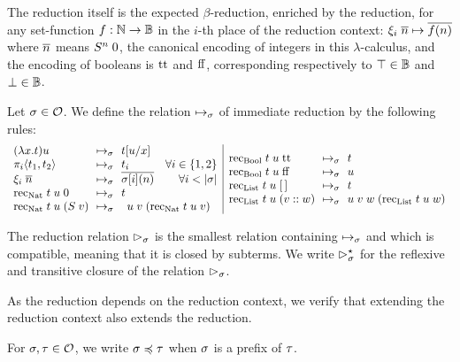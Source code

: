 \documentclass[a4paper,UKenglish,cleveref, autoref, thm-restate]{lipics-v2021}
\begin{document}
The reduction itself is the expected $\beta$-reduction, enriched by the reduction, for
any set-function $f : \mathbb N \to \mathbb B$ in the $i$-th place of the reduction context: $\xi_i \;\overline{n} \mapsto \overline{f(n)}$
where $\overline{n}$ means $S^n\;0$, the canonical encoding of integers in this $\lambda$-calculus, and the encoding of booleans is $\mathrm{tt}$ and $\mathrm{ff}$, corresponding respectively to $\top \in \mathbb B$ and $\bot \in \mathbb B$.

\begin{definition}[Reduction]
  Let $\sigma \in \mathcal O$.
  We define the relation $\mapsto_\sigma$ of immediate reduction by the following rules:
  \[\begin{array}{l@{~~}c@{~~}lr}
    (\lambda x.t)u & \rediE & t[u/x] \\
    \pi_i \langle t_1,t_2\rangle & \rediE & t_i & \forall i \in \{1,2\} \\
    \oracle_i\;\encode{n} & \rediE & \encode{\enviro[i](n)} & \forall i < |\enviro|\\
    \rec_{\Nat}\;t\;u\;\lamZ & \rediE & t \\
    \rec_{\Nat}\;t\;u\;(\lamS\;v) & \rediE & \multicolumn{2}{l}{u\;v\;(\rec_{\Nat}\;t\;u\;v) }\\
  \end{array}
  \vline
  \begin{array}{l@{~~}c@{~~}l}
    \rec_{\Bool}\;t\;u\;\rtt & \rediE & t \\
    \rec_{\Bool}\;t\;u\;\rff & \rediE &u \\
    \rec_{\List}\;t\;u\;\nil & \rediE &t \\
    \rec_{\List}\;t\;u\;(v \append w) & \rediE &u\;v\;w\;(\rec_{\List}\;t\;u\;w) \\
  \end{array}\]

  The reduction relation $\rhd_{\sigma}$ is the smallest relation containing $\mapsto_{\sigma}$ and which is compatible, meaning that it is closed by subterms. We write $\rhd^{\star}_{\sigma}$ for the reflexive and transitive closure of the relation $\rhd_{\sigma}$.
\end{definition}



As the reduction depends on the reduction context, we verify that extending the reduction context also extends the reduction.

\begin{notation}
  For $\sigma,\tau \in \mathcal O$, we write $\sigma \preccurlyeq \tau$ when $\sigma$ is a prefix of $\tau$.

  
  
\end{notation}
\end{document}
